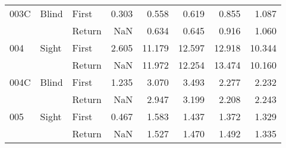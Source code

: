 \begin{table}[!htb]
\begin{tabular}{lllrrrrr}
003C & Blind & First &    0.303 &  0.558 &                                                 0.619 &                                                  0.855 &   1.087 \\
    &       & Return &      NaN &  0.634 &                                                 0.645 &                                                  0.916 &   1.060 \\
004 & Sight & First &    2.605 & 11.179 &                                                12.597 &                                                 12.918 &  10.344 \\
    &       & Return &      NaN & 11.972 &                                                12.254 &                                                 13.474 &  10.160 \\
004C & Blind & First &    1.235 &  3.070 &                                                 3.493 &                                                  2.277 &   2.232 \\
    &       & Return &      NaN &  2.947 &                                                 3.199 &                                                  2.208 &   2.243 \\
005 & Sight & First &    0.467 &  1.583 &                                                 1.437 &                                                  1.372 &   1.329 \\
    &       & Return &      NaN &  1.527 &                                                 1.470 &                                                  1.492 &   1.335 \\
\bottomrule
\end{tabular}
\end{table}

